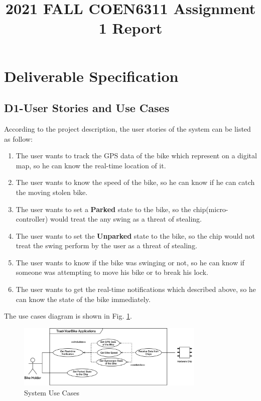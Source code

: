 \documentclass[transmag, conference, onecolumn]{IEEEtran}
\title{2021 FALL COEN6311 Assignment 1 Report}
\author{
    \IEEEauthorblockN{Jun Huang}
    \IEEEauthorblockA{
        40168167\\
        Email: youyinnn@foxmail.com
        }
}
\begin{document}
\maketitle

\section{Deliverable Specification}

\subsection*{\textbf{D1-User Stories and Use Cases}}

According to the project description, the user stories of the system can be listed as follow:

\begin{enumerate}
	\item The user wants to track the GPS data of the bike which represent on a digital map,
	      so he can know the real-time location of it.
	\item The user wants to know the speed of the bike, so he can know if he can catch the moving stolen bike.

	\item The user wants to set a \textbf{Parked} state to the bike,
	      so the chip(micro-controller) would treat the any swing as a threat of stealing.

	\item The user wants to set the \textbf{Unparked} state to the bike,
	      so the chip would not treat the swing perform by the user as a threat of stealing.

	\item The user wants to know if the bike was swinging or not,
	      so he can know if someone was attempting to move his bike or to break his lock.

	\item The user wants to get the real-time notifications which described above,
	      so he can know the state of the bike immediately.
\end{enumerate}

The use cases diagram is shown in Fig. \ref{fig:use-cases}.

\begin{figure}[!hb]
	\centering
	\includegraphics[width=0.8\textwidth]{./img/f1-use-cases.png}
	\caption{System Use Cases}
	\label{fig:use-cases}
\end{figure}
\end{document}
